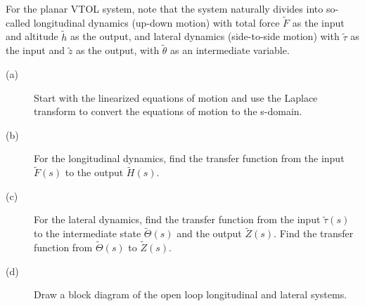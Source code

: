 For the planar VTOL system, note that the system naturally divides into so-called longitudinal dynamics (up-down motion) with total force $\tilde{F}$ as the input and altitude $\tilde{h}$ as the output, and lateral dynamics (side-to-side motion) with $\tilde{\tau}$ as the input and $\tilde{z}$ as the output, with $\tilde{\theta}$ as an intermediate variable.

  \begin{description}
    \item[(a)] Start with the linearized equations of motion and use the Laplace transform to convert the equations of motion to the s-domain. 
    \item[(b)] For the longitudinal dynamics, find the transfer function from the input $\tilde{F}(s)$ to the output $\tilde{H}(s)$.
    \item[(c)] For the lateral dynamics, find the transfer function from the input $\tilde{\tau}(s)$ to the intermediate state $\tilde{\Theta}(s)$ and the output $\tilde{Z}(s)$. Find the transfer function from $\tilde{\Theta}(s)$ to $\tilde{Z}(s)$.
    \item[(d)] Draw a block diagram of the open loop longitudinal and lateral systems.
  \end{description}

